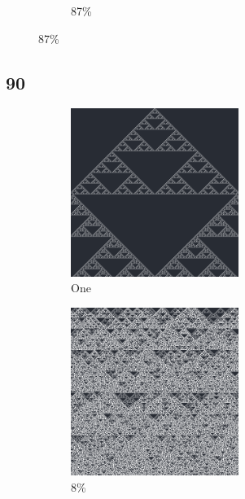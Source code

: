 \documentclass[12pt, fleqn]{report}                             %
\theoremstyle{break}                                            %
\begin{document}
\begin{figure}[ht!]
\begin{subfigure}[b]{0.4\linewidth}
          \caption{87\%}
        \end{subfigure}
      \end{figure}


      \clearpage
      \subsection{90}
      \begin{figure}[ht!]
        \centering
        \begin{subfigure}[b]{0.4\linewidth}
          \includegraphics[width=0.6\textwidth]{Images/90/a.png}
          \caption{One}
        \end{subfigure}
        \begin{subfigure}[b]{0.4\linewidth}
          \includegraphics[width=0.6\textwidth]{Images/90/b.png}
          \caption{8\%}
        \end{subfigure}
        \begin{subfigure}[b]{0.4\linewidth}

\end{subfigure}
\end{figure}
\end{document}
